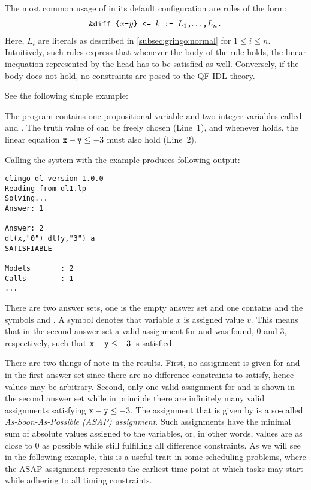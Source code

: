 The most common usage of  in its default configuration are rules of the form:
  \begin{align*}
    \texttt{\&diff\text{ }\{$x$-$y$\}\text{ }<=\text{ }$k$ :- $L_1$,$\dots$,$L_n$.}
  \end{align*}
Here, $L_i$ are literals as described in \ref{subsec:gringo:normal} for $1\leq i \leq n$.
Intuitively, such rules express that whenever the body of the rule holds, 
the linear inequation represented by the head has to be satisfied as well.
Conversely, if the body does not hold, no constraints are posed to the QF-IDL theory.
\begin{example}\label{ex:dl:simple}
         See the following simple example:
         
The program contains one propositional variable  and two integer variables called  and .
The truth value of  can be freely chosen (Line~1),
and whenever  holds, the linear equation $\texttt{x}-\texttt{y}\leq -3$ must also hold (Line~2).

Calling the system with the example produces following output:
\begin{lstlisting}[numbers=none]
clingo-dl version 1.0.0
Reading from dl1.lp
Solving...
Answer: 1

Answer: 2
dl(x,"0") dl(y,"3") a
SATISFIABLE

Models       : 2
Calls        : 1
...
\end{lstlisting}
There are two answer sets, one is the empty answer set and one contains  and the symbols  and .
A symbol  denotes that variable $x$ is assigned value $v$.
This means that in the second answer set a valid assignment for  and  was found,
0 and 3, respectively, such that $\texttt{x}-\texttt{y}\leq -3$ is satisfied.

There are two things of note in the results.
First, no assignment is given for  and  in the first answer set since there are no difference constraints to satisfy,
hence values may be arbitrary.
Second, only one valid assignment for  and  is shown in the second answer set 
while in principle there are infinitely many valid assignments satisfying $\texttt{x}-\texttt{y}\leq -3$.
The assignment that is given by  is a so-called \emph{As-Soon-As-Possible (ASAP) assignment}.
Such assignments have the minimal sum of absolute values assigned to the variables,
or, in other words, values are as close to 0 as possible while still fulfilling all difference constraints.
As we will see in the following example, this is a useful trait in some scheduling problems,
where the ASAP assignment represents the earliest time point at which tasks may start while adhering to all timing constraints.

 \end{example}


